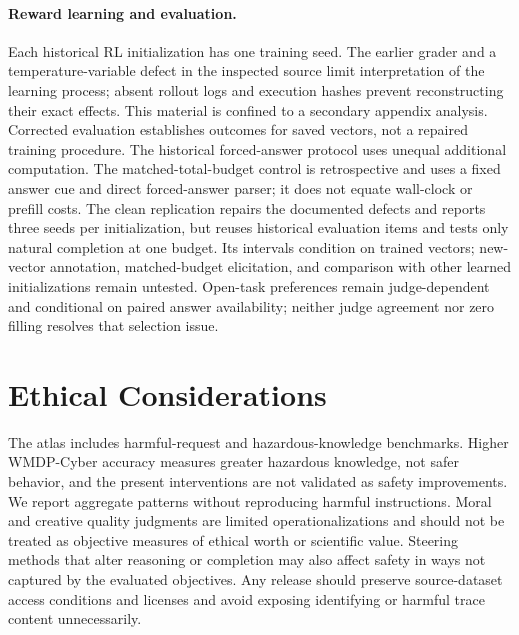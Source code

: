\paragraph{Reward learning and evaluation.}
Each historical RL initialization has one training seed. The earlier grader and a temperature-variable defect in the inspected source limit interpretation of the learning process; absent rollout logs and execution hashes prevent reconstructing their exact effects. This material is confined to a secondary appendix analysis. Corrected evaluation establishes outcomes for saved vectors, not a repaired training procedure. The historical forced-answer protocol uses unequal additional computation. The matched-total-budget control is retrospective and uses a fixed answer cue and direct forced-answer parser; it does not equate wall-clock or prefill costs. The clean replication repairs the documented defects and reports three seeds per initialization, but reuses historical evaluation items and tests only natural completion at one budget. Its intervals condition on trained vectors; new-vector annotation, matched-budget elicitation, and comparison with other learned initializations remain untested. Open-task preferences remain judge-dependent and conditional on paired answer availability; neither judge agreement nor zero filling resolves that selection issue.

\section*{Ethical Considerations}
The atlas includes harmful-request and hazardous-knowledge benchmarks. Higher WMDP-Cyber accuracy measures greater hazardous knowledge, not safer behavior, and the present interventions are not validated as safety improvements. We report aggregate patterns without reproducing harmful instructions. Moral and creative quality judgments are limited operationalizations and should not be treated as objective measures of ethical worth or scientific value. Steering methods that alter reasoning or completion may also affect safety in ways not captured by the evaluated objectives. Any release should preserve source-dataset access conditions and licenses and avoid exposing identifying or harmful trace content unnecessarily.
